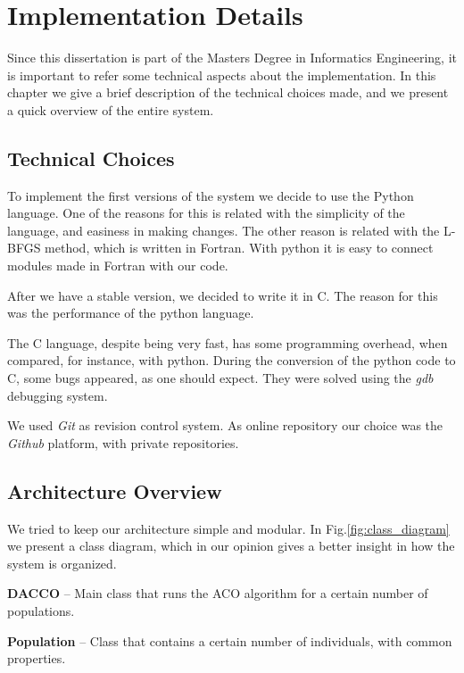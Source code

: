 \chapter{Implementation Details}
\label{chap:implementation}

Since this dissertation is part of the Masters Degree in Informatics Engineering, it is important to refer some technical aspects about the implementation. In this chapter we give a brief description of the technical choices made, and we present a quick overview of the entire system.

\section{Technical Choices}

To implement the first versions of the system we decide to use the Python language. One of the reasons for this is related with the simplicity of the language, and easiness in making changes. The other reason is related with the L-BFGS method, which is written in Fortran. With python it is easy to connect modules made in Fortran with our code.

After we have a stable version, we decided to write it in C. The reason for this was the performance of the python language. 

The C language, despite being very fast, has some programming overhead, when compared, for instance, with python. During the conversion of the python code to C, some bugs appeared, as one should expect. They were solved using the \emph{gdb} debugging system.

We used \emph{Git} as revision control system. As online repository our choice was the \emph{Github} platform, with private repositories.

\section{Architecture Overview}
We tried to keep our architecture simple and modular. In Fig.\ref{fig:class_diagram} we present a class diagram, which in our opinion gives a better insight in how the system is organized.

\textbf{DACCO} – Main class that runs the ACO algorithm for a certain number of populations.

\textbf{Population} – Class that contains a certain number of individuals, with common properties.

